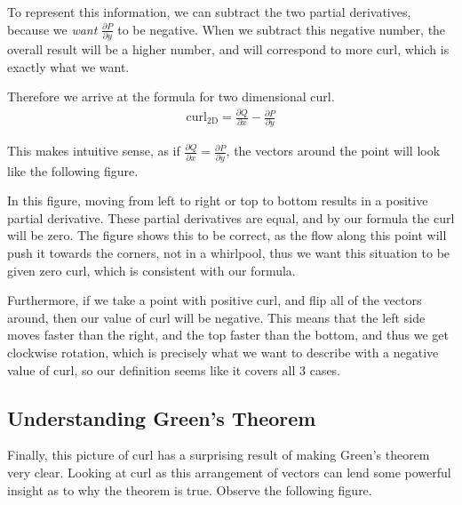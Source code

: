 \documentclass{article}
\begin{document}
    To represent this information, we can subtract the two partial derivatives, 
    because we \emph{want} $\frac{\partial P}{ \partial y}$ to be negative. When we subtract this negative number, the overall result will be a higher number, and will correspond to more curl, which is exactly what we want.

    Therefore we arrive at the formula for two dimensional curl.
    \begin{gather*}
        \text{curl}_\text{2D} =  \frac{\partial Q}{\partial x} - \frac{\partial P}{\partial y}
    \end{gather*}

    This makes intuitive sense, as if $\frac{\partial Q}{\partial x} = \frac{\partial P}{\partial y}$, the vectors around the point will look like the following figure.

    \begin{figure}[!h]
        \centering
    \end{figure}
    In this figure, moving from left to right or top to bottom results in a positive partial derivative.
    These partial derivatives are equal, and by our formula the curl will be zero.
    The figure shows this to be correct, as the flow along this point will push it towards the corners, not in a whirlpool, thus we want this situation to be given zero curl, which is consistent with our formula.

    Furthermore, if we take a point with positive curl, and flip all of the vectors around, then our value of curl will be negative.
    This means that the left side moves faster than the right, and the top faster than the bottom, and thus we get clockwise rotation, which is precisely what we want to describe with a negative value of curl,
    so our definition seems like it covers all 3 cases.

    \subsection*{Understanding Green's Theorem}
    Finally, this picture of curl has a surprising result of making Green's theorem very clear.
    Looking at curl as this arrangement of vectors can lend some powerful insight as to why the theorem is true.
    Observe the following figure.
\end{document}
